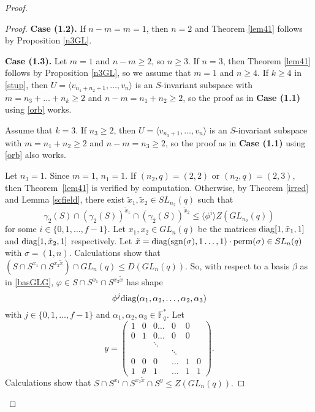 \begin{proof}
\begin{proof}
\medskip

{\bf Case (1.2).} If $n-m=m=1$, then $n=2$ and  Theorem \ref{lem41} follows by Proposition \ref{n3GL}.

\medskip

{\bf Case (1.3).} Let $m=1$ and $n-m \ge 2$, so $n \ge 3.$ %
If $n=3$, then Theorem \ref{lem41} follows by Proposition \ref{n3GL}, so we assume that $m=1$ and $n \ge 4.$ If $k\ge 4$ in \eqref{stup}, then $U = \langle v_{n_1+n_2+1}, \ldots, v_n \rangle$ is an $S$-invariant subspace with $m=n_3 + \ldots + n_k \ge 2$ and $n-m=n_1 +n_2 \ge 2$, so the proof as in {\bf Case (1.1)} using \eqref{orb} works.

 Assume that $k=3.$ If $n_3 \ge 2$, then    $U = \langle v_{n_3+1}, \ldots, v_n \rangle$ is an $S$-invariant subspace with $m=n_1 + n_2 \ge 2$ and $n-m=n_3 \ge 2$, so the proof as in {\bf Case (1.1)} using \eqref{orb} also works.

Let $n_3=1.$ Since $m=1$, $n_1=1.$ If $(n_2,q)=(2,2)$ or $(n_2,q)=(2,3)$, then Theorem~\ref{lem41} is verified by computation. Otherwise, by Theorem \ref{irred} and Lemma \ref{scfield}, there exist $\tilde{x}_1,\tilde{x}_2 \in SL_{n_2} (q)$  such that $$\gamma_2(S) \cap (\gamma_2(S))^{\tilde{x}_1} \cap (\gamma_2(S))^{\tilde{x}_2} \le \langle \phi^i \rangle Z(GL_{n_2}(q))$$ for some $i \in \{0, 1, \ldots, f-1\}$. Let $x_1, x_2 \in GL_n(q)$ be the matrices $\mathrm{diag}[1,\tilde{x}_1,1]$ and $\mathrm{diag}[1,\tilde{x}_2,1]$ respectively.  Let $\tilde{x}= \mathrm{diag}(\mathrm{sgn}(\sigma),1 \ldots, 1) \cdot \mathrm{perm}(\sigma) \in SL_n(q)$ with $\sigma=(1,n)$. Calculations show that $(S \cap S^{x_1} \cap S^{x_2 \tilde{x}}) \cap GL_n(q) \le D(GL_n(q)).$ So, with respect to a basis $\beta$ as in \eqref{basGLG},  $\varphi \in S \cap S^{x_1} \cap S^{x_2 \tilde{x}}$ has shape
$$\phi^j \mathrm{diag}(\alpha_1, \alpha_2, \ldots, \alpha_2, \alpha_3)$$ with $j \in \{0,1, \ldots, f-1\}$ and $\alpha_1, \alpha_2, \alpha_3 \in \mathbb{F}_q^*.$ Let 
$$y=
\begin{pmatrix}
1& 0      & 0\ldots  & 0 &0 \\
0& 1      & 0 \ldots  & 0 &0\\
&       &\ddots &  &  &\\
&       & & \ddots &  &\\
0& 0      & 0& \ldots & 1 &0 \\
1& \theta & 1& \ldots & 1 &1
\end{pmatrix}.$$
Calculations show that $S \cap S^{x_1} \cap S^{x_2 \tilde{x}} \cap S^y \le Z(GL_n(q)).$ 


\end{proof}
\end{proof}
